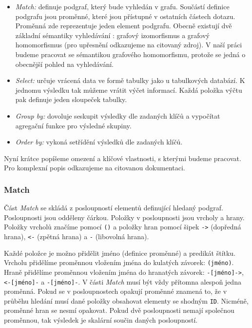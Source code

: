 \begin{itemize}
\item \textit{Match:} definuje podgraf, který bude vyhledán v grafu.
Součástí definice podgrafu jsou proměnné, které jsou přístupné v ostatních částech dotazu.
Proměnná zde reprezentuje jeden element podgrafu.
Obecně existují dvě základní sémantiky vyhledávání \citep{graphmatch}: grafový izomorfismus a grafový homomorfismus (pro upřesnění odkazujeme na citovaný zdroj).
V naší práci budeme pracovat se sémantikou grafového homomorfismu, protože se jedná o obecnější pohled na vyhledávání.

\item \textit{Select:} určuje vrácená data ve formě tabulky jako u tabulkových databází.
K jednomu výsledku tak můžeme vrátit výčet informací.
Každá položka výčtu pak definuje jeden sloupeček tabulky.

\item \textit{Group by:} dovoluje seskupit výsledky dle zadaných klíčů a vypočítat agregační funkce pro výsledné skupiny.

\item \textit{Order by:} vykoná setřídění výsledků dle zadaných klíčů.
\end{itemize}

Nyní krátce popíšeme omezení a klíčové vlastnosti, s kterými budeme pracovat.
Pro komplexní popis odkazujeme na citovanou dokumentaci.

\subsubsection{Match}

Část \textit{Match} se skládá z posloupností elementů definující hledaný podgraf.
Posloupnosti jsou odděleny čárkou.
Položky v posloupnosti jsou vrcholy a hrany.
Položky vrcholů značíme pomocí \texttt{()} a položky hran pomocí šipek \texttt{->} (dopředná hrana), \texttt{<-} (zpětná hrana) a \texttt{-} (libovolná hrana).

Každé položce je možno přidělit jméno (definice proměnné) a predikát štítku.
Vrcholu přidělíme proměnnou vložením jména do kulatých závorek: \texttt{(jméno)}.
Hraně přidělíme proměnnou vložením jména do hranatých závorek: \texttt{-[jméno]->}, \texttt{<-[jméno]-} a \texttt{-[jméno]-}.
V části \textit{Match} musí být vždy přítomna alespoň jedna proměnná.
Pokud se v posloupnostech opakují proměnné znamená to, že v průběhu hledání musí dané položky obsahovat elementy se shodným \texttt{ID}.
Nicméně, proměnné hran se nesmí opakovat.
Pokud dvě posloupnosti nemají společnou proměnnou, tak výsledek je skalární součin daných posloupností. 

